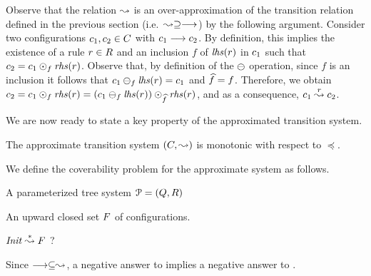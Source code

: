 Observe that the relation $\stackrel{}\leadsto$ is an over-approximation of the transition relation 
defined in the previous section (i.e.\ $\stackrel{}\leadsto\supseteq\stackrel{}\longrightarrow$) by the following 
argument.
%
Consider two configurations $c_1,c_2\in C$ with $c_1\stackrel{}\longrightarrow c_2$.
%
By definition, this implies the existence of a rule $r\in R$ and an inclusion $f$ of 
${\it lhs}({r})$ in $c_1$ such that $c_2=c_1\odot_f{\it rhs}({r})$.
%
Observe that, by definition of the $\ominus$ operation, since $f$ is an inclusion it follows that 
$c_1\ominus_f{\it lhs}({r})=c_1$ and $\widehat{f}=f$.
%
Therefore, we obtain $c_2=c_1\odot_f{\it rhs}({r})=(c_1\ominus_f{\it lhs}({r}))
\odot_{\widehat{f}}{\it rhs}({r})$, and as a consequence, $c_1\stackrel{r}\leadsto c_2$.
%

We are now ready to state a key property of the approximated transition system.
%
\begin{lemma}
\label{lem:approx:monotonic}
The approximate transition system $\left(C,\stackrel{}\leadsto\right)$ is 
monotonic with respect to $\preceq$.
\end{lemma}
%

We define the coverability problem for the approximate system as follows.
%

\probbox{\acovproblem}
{%
  \item A parameterized tree system ${\EuScript P}=\left(Q,R\right)$
  \item An upward closed set $F$ of configurations.
}{%
${\it Init}\stackrel{*}\leadsto{}F$ ?
}

%
Since $\stackrel{}\longrightarrow\subseteq\stackrel{}\leadsto$, a negative answer to \acovproblem{} implies
a negative answer to \covproblem.
%

